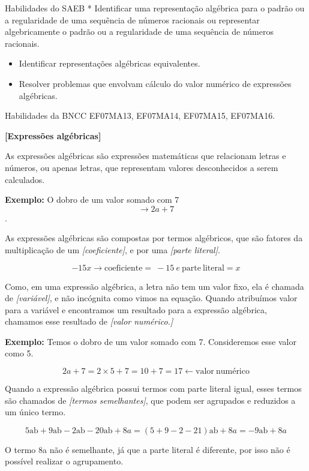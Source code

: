 Habilidades do SAEB * Identificar uma representação algébrica para o
padrão ou a regularidade de uma sequência de números racionais ou
representar algebricamente o padrão ou a regularidade de uma sequência
de números racionais.

\begin{itemize}
\item
  Identificar representações algébricas equivalentes.
\item
  Resolver problemas que envolvam cálculo do valor numérico de
  expressões algébricas.
\end{itemize}

Habilidades da BNCC EF07MA13, EF07MA14, EF07MA15, EF07MA16.

\textbf{{[}Expressões algébricas{]}}

As expressões algébricas são expressões matemáticas que relacionam
letras e números, ou apenas letras, que representam valores
desconhecidos a serem calculados.

\textbf{Exemplo:} O dobro de um valor somado com 7
\[\rightarrow 2a + 7\].

As expressões algébricas são compostas por termos algébricos, que são
fatores da multiplicação de um \emph{{[}coeficiente{]}}, e por uma
\emph{{[}parte literal{]}}.

\[- 15x \rightarrow \text{coeficiente} = \  - 15\ e\ \text{parte}\ \text{literal} = x\]

Como, em uma expressão algébrica, a letra não tem um valor fixo, ela é
chamada de \emph{{[}variável{]}}, e não incógnita como vimos na equação.
Quando atribuímos valor para a variável e encontramos um resultado para
a expressão algébrica, chamamos esse resultado de \emph{{[}valor
numérico.{]}}

\textbf{Exemplo:} Temos o dobro de um valor somado com 7. Consideremos
esse valor como 5.

\[2a + 7 = 2 \times 5 + 7 = 10 + 7 = 17 \leftarrow \text{valor}\ \text{num}é\text{rico}\]

Quando a expressão algébrica possui termos com parte literal igual,
esses termos são chamados de \emph{{[}termos semelhantes{]}}, que podem
ser agrupados e reduzidos a um único termo.

\[5\text{ab} + 9\text{ab} - 2\text{ab} - 20\text{ab} + 8a = \left( 5 + 9 - 2 - 21 \right)\text{ab} + 8a = - 9\text{ab} + 8a\]

O termo 8a não é semelhante, já que a parte literal é diferente, por
isso não é possível realizar o agrupamento.

